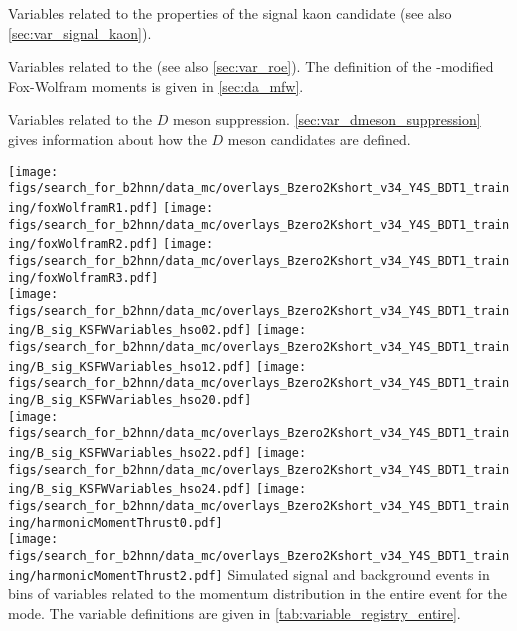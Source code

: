{
Variables related to the properties of the signal kaon candidate (see also \cref{sec:var_signal_kaon}).
}

{
Variables related to the \roe (see also \cref{sec:var_roe}).
The definition of the \ROE-\ROE modified Fox-Wolfram moments is given in \cref{sec:da_mfw}.
}

{
Variables related to the $D$ meson suppression.
\cref{sec:var_dmeson_suppression} gives information about how the $D$ meson candidates are defined.
}

{
\texttt{[image: figs/search\_for\_b2hnn/data\_mc/overlays\_Bzero2Kshort\_v34\_Y4S\_BDT1\_training/foxWolframR1.pdf]}
\texttt{[image: figs/search\_for\_b2hnn/data\_mc/overlays\_Bzero2Kshort\_v34\_Y4S\_BDT1\_training/foxWolframR2.pdf]}
\texttt{[image: figs/search\_for\_b2hnn/data\_mc/overlays\_Bzero2Kshort\_v34\_Y4S\_BDT1\_training/foxWolframR3.pdf]}\\
\texttt{[image: figs/search\_for\_b2hnn/data\_mc/overlays\_Bzero2Kshort\_v34\_Y4S\_BDT1\_training/B\_sig\_KSFWVariables\_hso02.pdf]}
\texttt{[image: figs/search\_for\_b2hnn/data\_mc/overlays\_Bzero2Kshort\_v34\_Y4S\_BDT1\_training/B\_sig\_KSFWVariables\_hso12.pdf]}
\texttt{[image: figs/search\_for\_b2hnn/data\_mc/overlays\_Bzero2Kshort\_v34\_Y4S\_BDT1\_training/B\_sig\_KSFWVariables\_hso20.pdf]}\\
\texttt{[image: figs/search\_for\_b2hnn/data\_mc/overlays\_Bzero2Kshort\_v34\_Y4S\_BDT1\_training/B\_sig\_KSFWVariables\_hso22.pdf]}
\texttt{[image: figs/search\_for\_b2hnn/data\_mc/overlays\_Bzero2Kshort\_v34\_Y4S\_BDT1\_training/B\_sig\_KSFWVariables\_hso24.pdf]}
\texttt{[image: figs/search\_for\_b2hnn/data\_mc/overlays\_Bzero2Kshort\_v34\_Y4S\_BDT1\_training/harmonicMomentThrust0.pdf]}\\
\texttt{[image: figs/search\_for\_b2hnn/data\_mc/overlays\_Bzero2Kshort\_v34\_Y4S\_BDT1\_training/harmonicMomentThrust2.pdf]}
}
{
Simulated signal and background events in bins of variables related to the momentum distribution in the entire event for the \BKznn mode.
\overlaytext
The variable definitions are given in \cref{tab:variable_registry_entire}.
}

